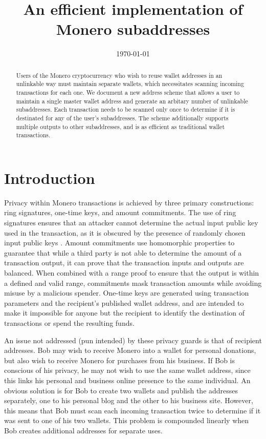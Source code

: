 \documentclass{mrl}
\title{An efficient implementation of Monero subaddresses}
\date{\today}
\begin{document}
\begin{abstract}
Users of the Monero cryptocurrency who wish to reuse wallet addresses in an unlinkable way must maintain separate wallets, which necessitates scanning incoming transactions for each one. We document a new address scheme that allows a user to maintain a single master wallet address and generate an arbitary number of unlinkable subaddresses. Each transaction needs to be scanned only once to determine if it is destinated for any of the user's subaddresses. The scheme additionally supports multiple outputs to other subaddresses, and is as efficient as traditional wallet transactions.
\end{abstract}

\section{Introduction}
Privacy within Monero transactions is achieved by three primary constructions: ring signatures, one-time keys, and amount commitments. The use of ring signatures ensures that an attacker cannot determine the actual input public key used in the transaction, as it is obscured by the presence of randomly chosen input public keys \cite{cryptonote}. Amount commitments use homomorphic properties to guarantee that while a third party is not able to determine the amount of a transaction output, it can prove that the transaction inputs and outputs are balanced. When combined with a range proof to ensure that the output is within a defined and valid range, commitments mask transaction amounts while avoiding misuse by a malicious spender. One-time keys are generated using transaction parameters and the recipient's published wallet address, and are intended to make it impossible for anyone but the recipient to identify the destination of transactions or spend the resulting funds.

An issue not addressed (pun intended) by these privacy guards is that of recipient addresses. Bob may wish to receive Monero into a wallet for personal donations, but also wish to receive Monero for purchases from his business. If Bob is conscious of his privacy, he may not wish to use the same wallet address, since this links his personal and business online presence to the same individual. An obvious solution is for Bob to create two wallets and publish the addresses separately, one to his personal blog and the other to his business site. However, this means that Bob must scan each incoming transaction twice to determine if it was sent to one of his two wallets. This problem is compounded linearly when Bob creates additional addresses for separate uses.
\end{document}
